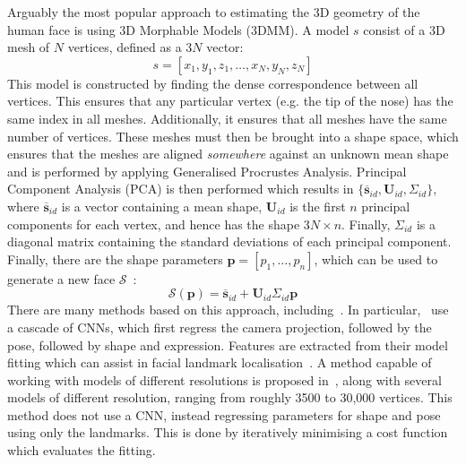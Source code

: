 Arguably the most popular approach to estimating the 3D geometry of
the human face is using 3D Morphable Models (3DMM). A model $s$
consist of a 3D mesh of $N$ vertices, defined as a $3N$ vector:
%
\begin{equation}
  s = [x_1, y_1, z_1, \dots, x_N, y_N, z_N]
\end{equation}
%
This model is constructed by finding the dense correspondence between
all vertices. This ensures that any particular vertex (e.g. the tip of
the nose) has the same index in all meshes. Additionally, it ensures
that all meshes have the same number of vertices. These meshes must
then be brought into a shape space, which ensures that the meshes are
aligned \textit{somewhere} against an unknown mean shape and is
performed by applying Generalised Procrustes Analysis. Principal
Component Analysis (PCA) is then performed which results in
$\{\boldsymbol{\overline{s}}_{id}, \boldsymbol{U}_{id},
\Sigma_{id}\}$, where $\boldsymbol{\overline{s}}_{id}$ is a vector
containing a mean shape, $\boldsymbol{U}_{id}$ is the first $n$
principal components for each vertex, and hence has the shape
$3N \times n$. Finally, $\Sigma_{id}$ is a diagonal matrix containing
the standard deviations of each principal component. Finally, there
are the shape parameters $\boldsymbol{p} = [p_1, \dots, p_n]$, which
can be used to generate a new face $\mathcal{S}$~\cite{booth20183d}:
%
\begin{equation}
  \mathcal{S}(\boldsymbol{p}) = \boldsymbol{\overline{s}}_{id}
  + \boldsymbol{U}_{id}\Sigma_{id}\boldsymbol{p}
\end{equation}
%
There are many methods based on this approach,
including~\cite{jourabloo2016large,huber2016multiresolution,zhu2016face,liu2016joint,tran2018extreme,jiang20183d,jiang2018pose}. In
particular,~\citeauthor{jourabloo2016large} use a cascade of CNNs,
which first regress the camera projection, followed by the pose,
followed by shape and expression. Features are extracted from their
model fitting which can assist in facial landmark
localisation~\cite{jourabloo2016large}. A method capable of working
with models of different resolutions is proposed
in~\cite{huber2016multiresolution}, along with several models of
different resolution, ranging from roughly 3500 to 30,000
vertices. This method does not use a CNN, instead regressing
parameters for shape and pose using only the landmarks. This is done
by iteratively minimising a cost function which evaluates the fitting.

